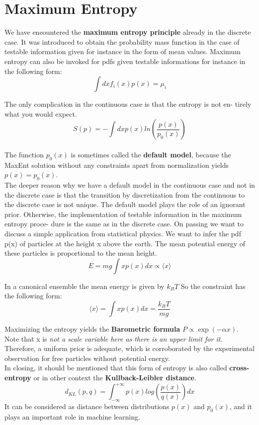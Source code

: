 \documentclass[12pt, a4paper]{scrartcl}
\begin{document}
\section*{Maximum Entropy}
We have encountered the \textbf{maximum entropy principle} already in the discrete case. It
was introduced to obtain the probability mass function in the case of testable
information given for instance in the form of mean values. Maximum entropy can also
be invoked for pdfs given testable informations for instance in the following form:\[\int dx f_i(x)p(x)=\mu_i\]

The only complication in the continuous case is that the entropy is not en-
tirely what you would expect.\\
\begin{equation*}\boxed{S(p)=-\int dx p(x)ln\left(\frac{p(x)}{p_0(x)}\right)
}\end{equation*}\\

The function $p_0(x)$ is sometimes called the \textbf{default model}, because the MaxEnt
solution without any constraints apart from normalization yields $p(x)=p_0(x)$.\\
The deeper reason why we have a default model in the continuous case and
not in the discrete case is that the transition by discretization from the
continuous to the discrete case is not unique.
The default model plays the role of an ignorant prior.
Otherwise, the implementation of testable information in the maximum entropy proce-
dure is the same as in the discrete case.
On passing we want to discuss a simple application from statistical physics.
We want to infer the pdf p(x) of particles at the height x above the earth.
The mean potential energy of these particles is proportional to the mean
height.\[E=mg\int x p(x)dx \propto \langle x\rangle\]

In a canonical ensemble the mean energy is given by $k_BT$
So the constraint has the following form: \[ \langle x \rangle = \int xp(x)dx = \frac{k_BT}{mg}\]

Maximizing the entropy yields the \textbf{Barometric formula} $P\propto \exp(-\alpha x)$.
Note that x is \textit{not
a scale variable here as there is an upper limit for it}. Therefore, a uniform prior
is adequate, which is corroborated by the experimental observation for free
particles without potential energy.\\

In closing, it should be mentioned that this form of entropy is also called
 \textbf{cross-entropy} or in other context the  \textbf{Kullback-Leibler distance}.
 \[d_{KL}(p,q)=\int_{-\infty}^{+\infty}p(x)log\left(\frac{p(x)}{q(x)}\right)dx\]
 It can be
considered as distance between distributions $p(x)$ and $p_0(x)$, and it plays
an important role in machine learning.\\
\end{document}
